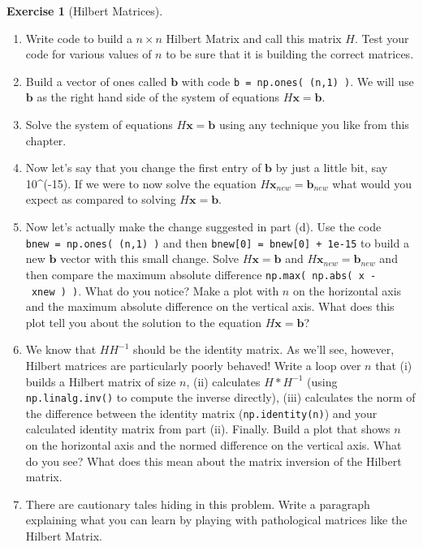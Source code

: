 \documentclass[
]{book}
\providecommand{\tightlist}{%
  \setlength{\itemsep}{0pt}\setlength{\parskip}{0pt}}
\theoremstyle{definition}
\theoremstyle{definition}
\theoremstyle{definition}
\newtheorem{exercise}{Exercise}[chapter]
\theoremstyle{remark}
\begin{document}
\begin{exercise}[Hilbert Matrices]
\begin{enumerate}
\def\labelenumi{\alph{enumi}.}
\tightlist
\item
  Write code to build a \(n\times n\) Hilbert Matrix and call this matrix \(H\). Test your code for various values of \(n\) to be sure that it is building the correct matrices.
\item
  Build a vector of ones called \(\boldsymbol{b}\) with code \texttt{b\ =\ np.ones(\ (n,1)\ )}. We will use \(\boldsymbol{b}\) as the right hand side of the system of equations \(H\boldsymbol{x} = \boldsymbol{b}\).
\item
  Solve the system of equations \(H \boldsymbol{x} = \boldsymbol{b}\) using any technique you like from this chapter.
\item
  Now let's say that you change the first entry of \(\boldsymbol{b}\) by just a little bit, say 10\^{}(-15). If we were to now solve the equation \(H \boldsymbol{x}_{new} = \boldsymbol{b}_{new}\) what would you expect as compared to solving \(H \boldsymbol{x} = \boldsymbol{b}\).
\item
  Now let's actually make the change suggested in part (d). Use the code \texttt{bnew\ =\ np.ones(\ (n,1)\ )} and then \texttt{bnew{[}0{]}\ =\ bnew{[}0{]}\ +\ 1e-15} to build a new \(\boldsymbol{b}\) vector with this small change. Solve \(H\boldsymbol{x}=\boldsymbol{b}\) and \(H\boldsymbol{x}_{new}=\boldsymbol{b}_{new}\) and then compare the maximum absolute difference \texttt{np.max(\ np.abs(\ x\ -\ xnew\ )\ )}. What do you notice? Make a plot with \(n\) on the horizontal axis and the maximum absolute difference on the vertical axis. What does this plot tell you about the solution to the equation \(H \boldsymbol{x} = \boldsymbol{b}\)?
\item
  We know that \(H H^{-1}\) should be the identity matrix. As we'll see, however, Hilbert matrices are particularly poorly behaved! Write a loop over \(n\) that (i) builds a Hilbert matrix of size \(n\), (ii) calculates \(H * H^{-1}\) (using \texttt{np.linalg.inv()} to compute the inverse directly), (iii) calculates the norm of the difference between the identity matrix (\texttt{np.identity(n)}) and your calculated identity matrix from part (ii). Finally. Build a plot that shows \(n\) on the horizontal axis and the normed difference on the vertical axis. What do you see? What does this mean about the matrix inversion of the Hilbert matrix.
\item
  There are cautionary tales hiding in this problem. Write a paragraph explaining what you can learn by playing with pathological matrices like the Hilbert Matrix.
\end{enumerate}
\end{exercise}
\end{document}
